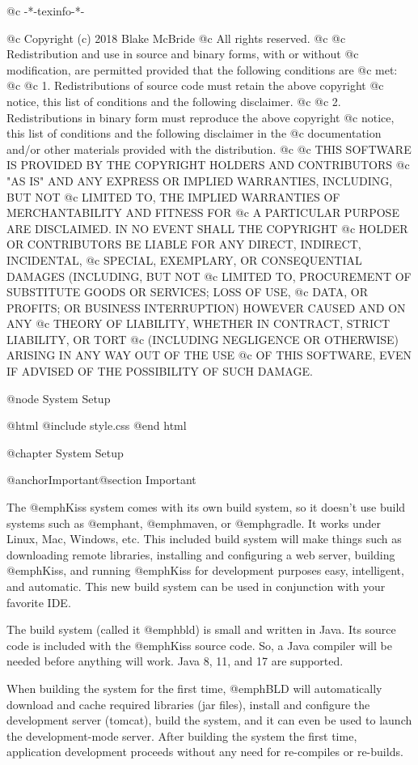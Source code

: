 @c -*-texinfo-*-

@c  Copyright (c) 2018 Blake McBride
@c  All rights reserved.
@c
@c  Redistribution and use in source and binary forms, with or without
@c  modification, are permitted provided that the following conditions are
@c  met:
@c
@c  1. Redistributions of source code must retain the above copyright
@c  notice, this list of conditions and the following disclaimer.
@c
@c  2. Redistributions in binary form must reproduce the above copyright
@c  notice, this list of conditions and the following disclaimer in the
@c  documentation and/or other materials provided with the distribution.
@c
@c  THIS SOFTWARE IS PROVIDED BY THE COPYRIGHT HOLDERS AND CONTRIBUTORS
@c  "AS IS" AND ANY EXPRESS OR IMPLIED WARRANTIES, INCLUDING, BUT NOT
@c  LIMITED TO, THE IMPLIED WARRANTIES OF MERCHANTABILITY AND FITNESS FOR
@c  A PARTICULAR PURPOSE ARE DISCLAIMED. IN NO EVENT SHALL THE COPYRIGHT
@c  HOLDER OR CONTRIBUTORS BE LIABLE FOR ANY DIRECT, INDIRECT, INCIDENTAL,
@c  SPECIAL, EXEMPLARY, OR CONSEQUENTIAL DAMAGES (INCLUDING, BUT NOT
@c  LIMITED TO, PROCUREMENT OF SUBSTITUTE GOODS OR SERVICES; LOSS OF USE,
@c  DATA, OR PROFITS; OR BUSINESS INTERRUPTION) HOWEVER CAUSED AND ON ANY
@c  THEORY OF LIABILITY, WHETHER IN CONTRACT, STRICT LIABILITY, OR TORT
@c  (INCLUDING NEGLIGENCE OR OTHERWISE) ARISING IN ANY WAY OUT OF THE USE
@c  OF THIS SOFTWARE, EVEN IF ADVISED OF THE POSSIBILITY OF SUCH DAMAGE.


@node System Setup

@html
@include style.css
@end html

@chapter System Setup

@anchor{Important}@section Important

The @emph{Kiss} system comes with its own build system, so it doesn't
use build systems such as @emph{ant}, @emph{maven}, or @emph{gradle}.
It works under Linux, Mac, Windows, etc. This included build system
will make things such as downloading remote libraries, installing and
configuring a web server, building @emph{Kiss}, and running
@emph{Kiss} for development purposes easy, intelligent, and automatic.
This new build system can be used in conjunction with your favorite IDE.

The build system (called it @emph{bld}) is small and written in Java.
Its source code is included with the @emph{Kiss} source code.  So, a
Java compiler will be needed before anything will work.  
Java 8, 11, and 17 are supported.

When building the system for the first time, @emph{BLD} will
automatically download and cache required libraries (jar files), install and
configure the development server (tomcat), build the system, and it
can even be used to launch the development-mode server.  After building
the system the first time, application development proceeds without
any need for re-compiles or re-builds.

